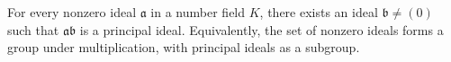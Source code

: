 For every nonzero ideal $\mathfrak{a}$ in a number field $K$, there exists an ideal $\mathfrak{b} \neq (0)$ such that $\mathfrak{a}\mathfrak{b}$ is a principal ideal. Equivalently, the set of nonzero ideals forms a group under multiplication, with principal ideals as a subgroup.
